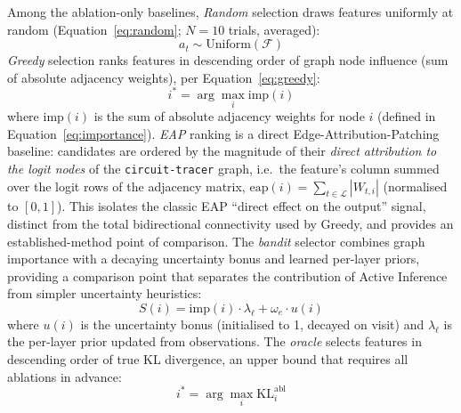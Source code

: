 Among the ablation-only baselines, \emph{Random} selection draws features uniformly at random
(Equation~\ref{eq:random}; $N=10$ trials, averaged):
\begin{equation}
  \label{eq:random}
  a_t \sim \text{Uniform}(\mathcal{F})
\end{equation}
\emph{Greedy} selection ranks features in descending order of graph
node influence (sum of absolute adjacency weights), per
Equation~\ref{eq:greedy}:
\begin{equation}
  \label{eq:greedy}
  i^* = \arg\max_i \text{imp}(i)
\end{equation}
where $\text{imp}(i)$ is the sum of absolute adjacency weights for node
$i$ (defined in Equation~\ref{eq:importance}).
\emph{EAP} ranking is a direct Edge-Attribution-Patching baseline: candidates are
ordered by the magnitude of their \emph{direct attribution to the logit nodes} of
the \texttt{circuit-tracer} graph, i.e.\ the feature's column summed over the logit
rows of the adjacency matrix, $\mathrm{eap}(i)=\sum_{t\in\mathcal{L}}|W_{t,i}|$
(normalised to $[0,1]$). This isolates the classic EAP ``direct effect on the
output'' signal, distinct from the total bidirectional connectivity used by Greedy,
and provides an established-method point of comparison.
The \emph{bandit}
selector combines graph importance with a decaying uncertainty bonus
and learned per-layer priors, providing a comparison point that
separates the contribution of Active Inference from simpler
uncertainty heuristics:
\begin{equation}
  \label{eq:bandit}
  S(i) = \text{imp}(i)\cdot\lambda_\ell + \omega_e \cdot u(i)
\end{equation}
where $u(i)$ is the uncertainty bonus (initialised to 1, decayed on
visit) and $\lambda_\ell$ is the per-layer prior updated from
observations. 
The \emph{oracle} selects features in descending order
of true KL divergence, an upper bound that requires all ablations in
advance:
\begin{equation}
  \label{eq:oracle}
  i^* = \arg\max_i \text{KL}_i^{\text{abl}}
\end{equation}

